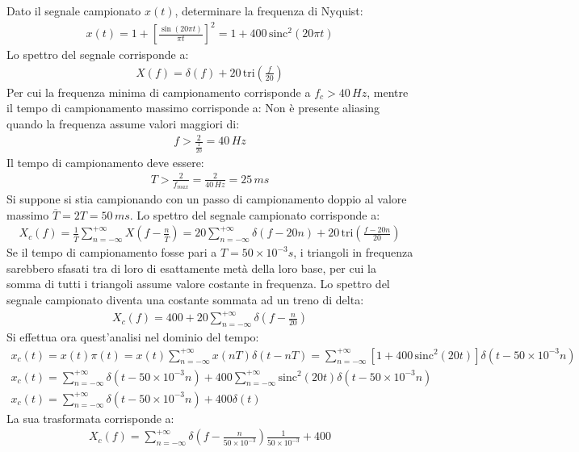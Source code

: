 \documentclass{article}
\newcommand{\sinc}{\mathrm{sinc}}
\newcommand{\tri}{\mathrm{tri}}
\begin{document}
Dato il segnale campionato $x(t)$, determinare la frequenza di Nyquist: 
\begin{gather*}
    x(t)=1+\left[\displaystyle\frac{\sin(20\pi t)}{\pi t}\right]^2=1+400\,\sinc^2\left(20\pi t\right)
\end{gather*}
Lo spettro del segnale corrisponde a:
\begin{gather*}
    X(f)=\displaystyle \delta(f)+20\,\tri \left(\frac{f}{20}\right)
\end{gather*}
Per cui la frequenza minima di campionamento corrisponde a $f_c>40\,Hz$, mentre il tempo di campionamento massimo corrisponde a:
Non è presente aliasing quando la frequenza assume valori maggiori di:
\begin{gather*}
    f>\displaystyle\frac{2}{\frac{1}{20}}=40\,Hz
\end{gather*}
Il tempo di campionamento deve essere:
\begin{gather}
    T>\displaystyle\frac{2}{f_{max}}=\frac{2}{40\,Hz}=25\,ms
\end{gather}
Si suppone si stia campionando con un passo di campionamento doppio al valore massimo $\overline{T}=2T=50\,ms$. Lo spettro del segnale campionato corrisponde a:
\begin{gather*}
    X_c(f)=\displaystyle \frac{1}{\overline{T}}\sum_{n=-\infty}^{+\infty}X\left(f-\frac{n}{\overline{T}}\right)=20\sum_{n=-\infty}^{+\infty}\delta(f-20n)+20\,\tri \left(\frac{f-20n}{20}\right)
\end{gather*}
Se il tempo di campionamento fosse pari a $T=50\times10^{-3}s$, i triangoli in frequenza sarebbero sfasati tra di loro di esattamente metà della loro base, per cui la 
somma di tutti i triangoli assume valore costante in frequenza. 
Lo spettro del segnale campionato diventa una costante sommata ad un treno di delta:
\begin{gather}
    X_c(f)=400+20\displaystyle\sum_{n=-\infty}^{+\infty}\delta\left(f-\frac{n}{20}\right)
\end{gather}
Si effettua ora quest'analisi nel dominio del tempo:
\begin{gather*}
    x_c(t)=x(t)\pi(t)=x(t)\displaystyle\sum_{n=-\infty}^{+\infty}x(nT)\delta(t-nT)=\sum_{n=-\infty}^{+\infty}\left[1+400\,\sinc^2\left(20t\right)\right]\delta(t-50\times10^{-3}n)\\
    x_c(t)=\displaystyle\sum_{n=-\infty}^{+\infty}\delta(t-50\times10^{-3}n)+400\sum_{n=-\infty}^{+\infty}\sinc^2(20t)\delta(t-50\times10^{-3}n)\\
    x_c(t)=\displaystyle\sum_{n=-\infty}^{+\infty}\delta(t-50\times10^{-3}n)+400\delta(t)
\end{gather*}
La sua trasformata corrisponde a:
\begin{gather*}
    X_c(f)=\displaystyle\sum_{n=-\infty}^{+\infty}\delta\left(f-\frac{n}{50\times10^{-3}}\right)\frac{1}{50\times10^{-3}}+400
\end{gather*}
\end{document}
